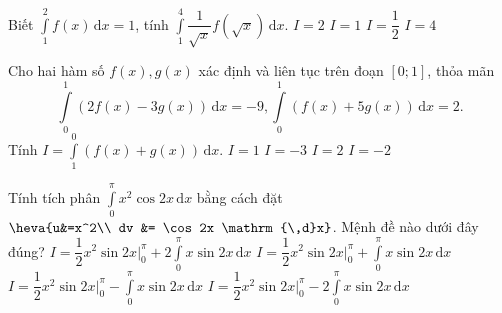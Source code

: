 \begin{ex}%
	Biết $\displaystyle\int\limits_1^2 f(x)\mathrm{\, d}x=1$, tính $\displaystyle\int\limits_1^4 \dfrac{1}{\sqrt{x}} f\left(\sqrt{x}\right)\mathrm{\, d}x$.
	\choice
	{\True $I=2$}
	{$I=1$}
	{$I=\dfrac{1}{2}$}
	{$I=4$}
\end{ex}
\begin{ex}%
	Cho hai hàm số $f(x), g(x)$ xác định và liên tục trên đoạn $[0;1]$, thỏa mãn $$\displaystyle\int\limits_0^1\left(2f(x)-3g(x)\right)\mathrm{\,d}x=-9, \displaystyle\int\limits_0^1\left(f(x)+5g(x)\right)\mathrm{\,d}x=2.$$
	Tính $I=\displaystyle\int\limits_1^0\left(f(x)+g(x)\right)\mathrm{\,d}x$.
	\choice
	{$I=1$}
	{$I=-3$}
	{\True $I=2$}
	{$I=-2$}
\end{ex}
\begin{ex}%
	Tính tích phân $\displaystyle \int \limits _{0}^{\pi} x^2 \cos 2x \mathrm{\,d}x $ bằng cách đặt $\heva{u&=x^2\\ dv &= \cos 2x \mathrm{\,d}x}$. Mệnh đề nào dưới đây đúng?
	\choice
	{$\displaystyle I= \dfrac{1}{2} x^2 \sin 2x \bigg|_0 ^ {\pi} + \displaystyle 2 \int \limits _{0}^{\pi} x \sin 2x \mathrm{\,d}x$}
	{$\displaystyle I= \dfrac{1}{2} x^2 \sin 2x \bigg|_0 ^ {\pi} + \displaystyle \int \limits _{0}^{\pi} x \sin 2x \mathrm{\,d}x$}
	{\True $\displaystyle I= \dfrac{1}{2} x^2 \sin 2x \bigg|_0 ^ {\pi} - \displaystyle \int \limits _{0}^{\pi} x \sin 2x \mathrm{\,d}x$}
	{$\displaystyle I= \dfrac{1}{2} x^2 \sin 2x \bigg|_0 ^ {\pi} - \displaystyle 2 \int \limits _{0}^{\pi} x \sin 2x \mathrm{\,d}x$}
\end{ex}
